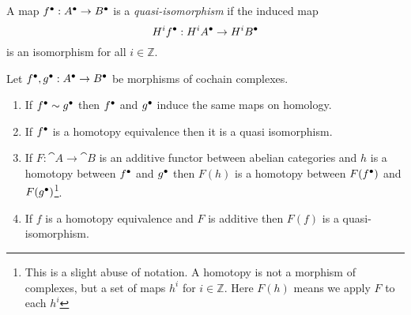 \begin{defn}
	A map ${f}^\bullet: {A}^\bullet \to {B}^\bullet$ is a \emph{quasi-isomorphism} if the induced map \[
    	\cohomology^i{\cochaincomplex{f}}: \cohomology^i{\cochaincomplex{A}} \to \cohomology^i{\cochaincomplex{B}}
    \] is an isomorphism for all $i \in \mathbb{Z}$. 
\end{defn}

\begin{exc}\label{exc:properties-of-homotopy}
	Let ${f}^\bullet, {g}^\bullet: {A}^\bullet \to {B}^\bullet$ be morphisms of cochain complexes. 
	\begin{enumerate}[label=(\alph*)]
    	\item If ${f}^\bullet \sim {g}^\bullet$ then ${f}^\bullet$ and ${g}^\bullet$ induce the same maps on homology. 
		\item If ${f}^\bullet$ is a homotopy equivalence then it is a quasi isomorphism.
		\item If $F: \cat A \to \cat B$ is an additive functor between abelian categories and $h$ is a homotopy between ${f}^\bullet$ and ${g}^\bullet$ then $F(h)$ is a homotopy between $F({f}^\bullet)$ and $F({g}^\bullet)$\footnote{This is a slight abuse of notation. A homotopy is not a morphism of complexes, but a set of maps $h^i$ for $i \in \mathbb{Z}$. Here $F(h)$ means we apply $F$ to each $h^i$}.
		\item If $f$ is a homotopy equivalence and $F$ is additive then $F(f)$ is a quasi-isomorphism. 
    \end{enumerate}
\end{exc}

